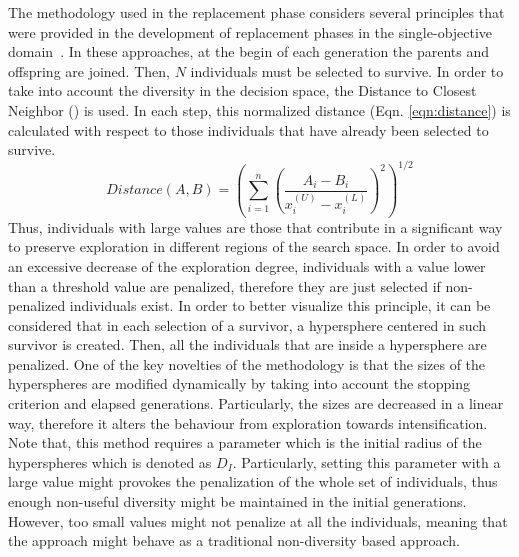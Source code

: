 The methodology used in the replacement phase considers several principles that were provided in the 
development of replacement phases in the single-objective domain~\cite{Joel:MULTI_DYNAMIC}.
%
%
In these approaches, at the begin of each generation the parents and offspring are joined.
%
Then, $N$ individuals must be selected to survive.
%
In order to take into account the diversity in the decision space, the 
Distance to Closest Neighbor (\DCN{}) is used.
%
In each step, this normalized distance (Eqn. \ref{eqn:distance}) is calculated with respect to those individuals that have already been selected to survive.
%
\begin{equation}\label{eqn:distance}
Distance(A, B) = \left (\sum_{i=1}^n \left ( \frac{A_i - B_i}{x_i^{(U)} - x_i^{(L)}} \right )^2  \right)^{1/2}
\end{equation}
Thus, individuals with large \DCN{} values are those that contribute in a significant way to preserve exploration in different regions of the search space.
%
In order to avoid an excessive decrease of the exploration degree, individuals with a \DCN{} value lower than a threshold value are penalized, therefore
they are just selected if non-penalized individuals exist.
%
In order to better visualize this principle, it can be considered that in each selection of a survivor, a hypersphere centered in such survivor is created.
%
Then, all the individuals that are inside a hypersphere are penalized.
%
One of the key novelties of the methodology is that the sizes of the hyperspheres are modified dynamically by taking into account the stopping criterion
and elapsed generations.
%
Particularly, the sizes are decreased in a linear way, therefore it alters the behaviour from exploration towards intensification.
%
Note that, this method requires a parameter which is the initial radius of the hyperspheres which is denoted as $D_I$. 
%
Particularly, setting this parameter with a large value might provokes the penalization of the whole set of individuals, thus enough non-useful diversity might be maintained in the initial generations.
%
However, too small values might not penalize at all the individuals, meaning that the approach might behave as a traditional non-diversity based approach.

